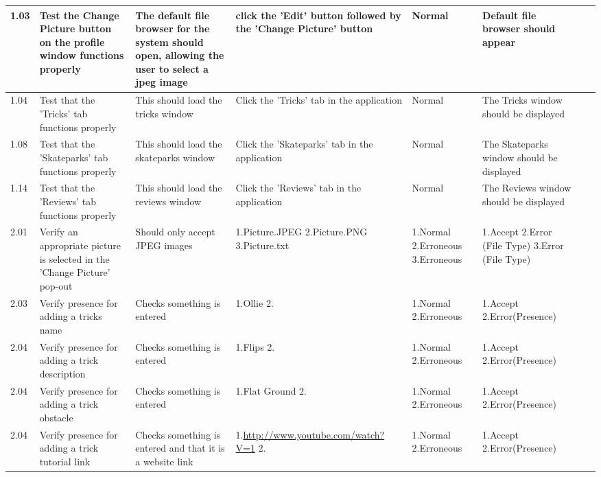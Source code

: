 \begin{landscape}
\begin{center}
\begin{longtable}{|p{1.5cm}|p{2.5cm}|p{2.5cm}|p{2cm}|p{2cm}|p{2cm}|p{2cm}|p{2cm}|}
1.03 & Test the Change Picture button on the profile window functions properly &  The default file browser for the system should open, allowing the user to select a jpeg image & click the 'Edit' button followed by the 'Change Picture' button & Normal & Default file browser should appear & &\\ \hline



1.04 & Test that the 'Tricks' tab functions properly & This should load the tricks window & Click the 'Tricks' tab in the application & Normal & The Tricks window should be displayed & & \\ \hline



1.08 & Test that the 'Skateparks' tab functions properly & This should load the skateparks window &Click the 'Skateparks' tab in the application & Normal & The Skateparks window should be displayed & & \\ \hline


1.14 & Test that the 'Reviews' tab functions properly & This should load the reviews window & Click the 'Reviews' tab in the application & Normal & The Reviews window should be displayed & &  \\ \hline



2.01 & Verify an appropriate picture is selected in the 'Change Picture' pop-out & Should only accept JPEG images & 1.Picture.JPEG 2.Picture.PNG 3.Picture.txt & 1.Normal 2.Erroneous 3.Erroneous & 1.Accept 2.Error (File Type) 3.Error (File Type) & & \\ \hline


2.03 & Verify presence for adding a tricks name & Checks something is entered & 1.Ollie 2.  & 1.Normal 2.Erroneous & 1.Accept 2.Error(Presence) & & \\ \hline

2.04 & Verify presence for adding a trick description & Checks something is entered & 1.Flips 2. & 1.Normal 2.Erroneous & 1.Accept 2.Error(Presence) & & \\ \hline

2.04 & Verify presence for adding a trick obstacle & Checks something is entered & 1.Flat Ground 2. & 1.Normal 2.Erroneous & 1.Accept 2.Error(Presence) & & \\ \hline

2.04 & Verify presence for adding a trick tutorial link & Checks something is entered and that it is a website link & 1.\url{http://www.youtube.com/watch?V=1} 2. & 1.Normal 2.Erroneous & 1.Accept 2.Error(Presence) & & \\ \hline


\end{longtable}
\end{center}
\end{landscape}
